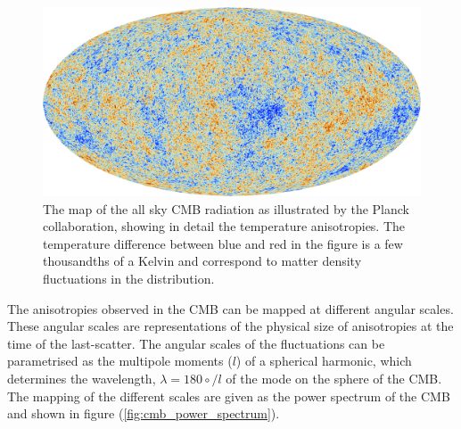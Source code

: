 \begin{figure}[ht!]
    \begin{center}
        \includegraphics[scale=0.2]{Chapter_1/Figures/Planck_CMB.jpg}
        \caption[The map of the all sky CMB radiation as illustrated by the Planck collaboration, showing in detail the temperature anisotropies.]%
        {The map of the all sky CMB radiation as illustrated by the Planck collaboration, showing in detail the temperature anisotropies. The temperature difference between blue and red in the figure is a few thousandths of a Kelvin and correspond to matter density fluctuations in the distribution.}
        \label{fig:cmb_map}
        \end{center}
\end{figure}

The anisotropies observed in the CMB can be mapped at different angular scales. These angular scales are representations of the physical size of anisotropies at the time of the last-scatter. The angular scales of the fluctuations can be parametrised as the multipole moments ($l$) of a spherical harmonic, which determines the wavelength, $\lambda = 180\circ/l$ of the mode on the sphere of the CMB. The mapping of the different scales are given as the power spectrum of the CMB and shown in figure (\ref{fig:cmb_power_spectrum}).

